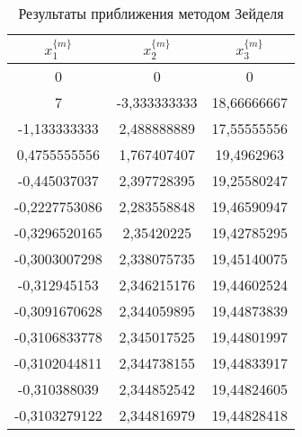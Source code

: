 \documentclass[10pt, a4paper, titlepage]{article}
\begin{document}
\begin{table}[htb]
    \centering
    \begin{tabular}{|*{3}{S[round-precision=8]|}}
        \toprule
        
        {$x_1^{\{m\}}$} & {$x_2^{\{m\}}$} & {$x_3^{\{m\}}$} \\
        
        \midrule
        
        0 & 0 & 0 \\
        
        7 & -3,333333333 & 18,66666667 \\
        
        -1,133333333 & 2,488888889 & 17,55555556 \\
        
        0,4755555556 & 1,767407407 & 19,4962963 \\
        
        -0,445037037 & 2,397728395 & 19,25580247 \\
        
        -0,2227753086 & 2,283558848 & 19,46590947 \\
        
        -0,3296520165 & 2,35420225 & 19,42785295 \\
        
        -0,3003007298 & 2,338075735 & 19,45140075 \\
        
        -0,312945153 & 2,346215176 & 19,44602524 \\
        
        -0,3091670628 & 2,344059895 & 19,44873839 \\
        
        -0,3106833778 & 2,345017525 & 19,44801997 \\
        
        -0,3102044811 & 2,344738155 & 19,44833917 \\
        
        -0,310388039 & 2,344852542 & 19,44824605 \\
        
        -0,3103279122 & 2,344816979 & 19,44828418 \\
        
        \bottomrule
    \end{tabular}
    \caption{Результаты приближения методом Зейделя}
    \label{sr1Task3Table}
\end{table}
\end{document}
